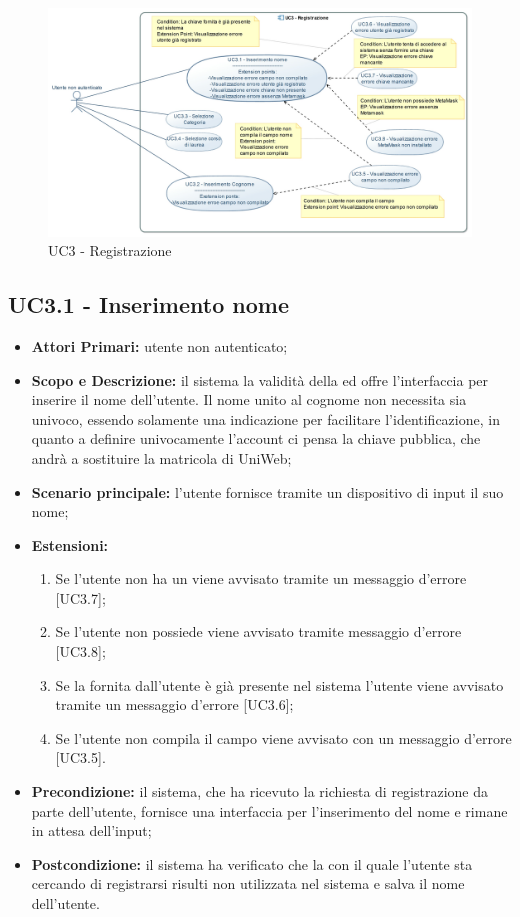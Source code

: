 \documentclass[AnalisiDeiRequisiti.tex]{subfiles}
\begin{document}
\begin{figure}[H]
	\centering
	\includegraphics[width=1.0\linewidth]{UC3.jpg}
	\caption{UC3 - Registrazione}
	\label{fig:UC3 - Registrazione}
\end{figure}


\subsection{UC3.1 - Inserimento nome}
\begin{itemize}
	\item \textbf{Attori Primari:} utente non autenticato;
	\item \textbf{Scopo e Descrizione:} il sistema  la validità della  ed offre l'interfaccia per inserire il nome dell'utente. Il nome unito al cognome non necessita sia univoco, essendo solamente una indicazione per facilitare l'identificazione, in quanto a definire univocamente l'account ci pensa la chiave pubblica, che andrà a sostituire la matricola di UniWeb;
	\item \textbf{Scenario principale:} l'utente fornisce tramite un dispositivo di input il suo nome;
	\item \textbf{Estensioni:}
		\begin{enumerate}
			\item Se l'utente non ha un  viene avvisato tramite un messaggio d'errore [UC3.7];
			\item Se l'utente non possiede  viene avvisato tramite messaggio d'errore [UC3.8];
			\item Se la  fornita dall'utente è già presente nel sistema l'utente viene avvisato tramite un messaggio d'errore [UC3.6];
			\item Se l'utente non compila il campo viene avvisato con un messaggio d'errore [UC3.5].
		\end{enumerate}
	\item \textbf{Precondizione:} il sistema, che ha ricevuto la richiesta di registrazione da parte dell'utente, fornisce una interfaccia per l'inserimento del nome e rimane in attesa dell'input;
	\item \textbf{Postcondizione:} il sistema ha verificato che la  con il quale l'utente sta cercando di registrarsi risulti non utilizzata nel sistema e salva il nome dell'utente.
\end{itemize}	
\end{document}
